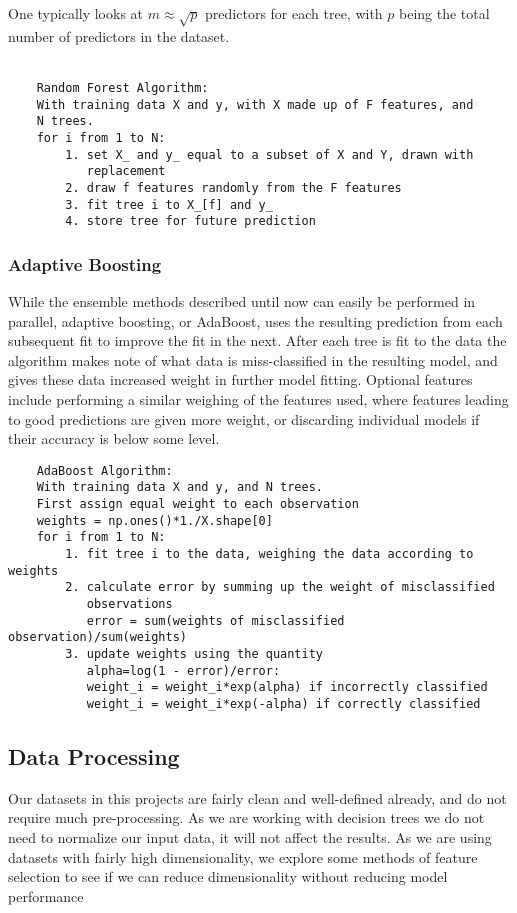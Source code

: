\documentclass[11pt]{article}
\begin{document}
One typically looks at \(m \approx\sqrt{p}\) predictors for each tree,
with \(p\) being the total number of predictors in the dataset.
\\
\\
\begin{BVerbatim}
    Random Forest Algorithm: 
    With training data X and y, with X made up of F features, and
    N trees. 
    for i from 1 to N: 
        1. set X_ and y_ equal to a subset of X and Y, drawn with 
           replacement 
        2. draw f features randomly from the F features 
        3. fit tree i to X_[f] and y_ 
        4. store tree for future prediction
\end{BVerbatim}


    \hypertarget{adaptive-boosting}{%
\subsubsection{Adaptive Boosting}\label{adaptive-boosting}}

While the ensemble methods described until now can easily be performed
in parallel, adaptive boosting, or AdaBoost, uses the resulting
prediction from each subsequent fit to improve the fit in the next.
After each tree is fit to the data the algorithm makes note of what data
is miss-classified in the resulting model, and gives these data increased
weight in further model fitting. Optional features include performing a
similar weighing of the features used, where features leading to good
predictions are given more weight, or discarding individual  models if their accuracy
is below some level.

\begin{BVerbatim}
	AdaBoost Algorithm:
	With training data X and y, and N trees.
	First assign equal weight to each observation
	weights = np.ones()*1./X.shape[0]
	for i from 1 to N:
	    1. fit tree i to the data, weighing the data according to weights
		2. calculate error by summing up the weight of misclassified
		   observations
	       error = sum(weights of misclassified observation)/sum(weights)
		3. update weights using the quantity
		   alpha=log(1 - error)/error: 
		   weight_i = weight_i*exp(alpha) if incorrectly classified 
		   weight_i = weight_i*exp(-alpha) if correctly classified 
\end{BVerbatim}

    \hypertarget{data-processing}{%
\subsection{Data Processing}\label{data-processing}}
Our datasets in this projects are fairly clean and well-defined already, and do not require much pre-processing. As we are working with decision trees we do not need to normalize our input data, it will not affect the results. As we are using datasets with fairly high dimensionality, we explore some methods of feature selection to see if we can reduce dimensionality without reducing model performance
\end{document}
